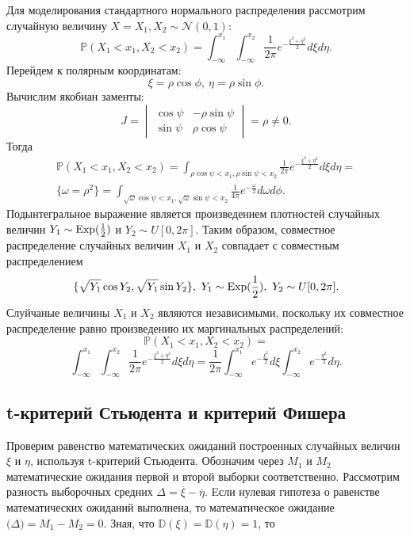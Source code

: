 \documentclass[11pt]{article}
\newcommand{\expon}{\normalfont{\text{Exp}}}
\numberwithin{equation}{section}
\begin{document}
Для моделирования стандартного нормального распределения рассмотрим случайную величину $X = {X_1, X_2} \sim \mathcal{N} (0, 1)$:
$$\mathbb{P}(X_1<x_1, X_2 < x_2) = \int_{-\infty}^{x_1}\int_{-\infty}^{x_2} \frac{1}{2\pi} e^{-\frac{\xi^2+\eta^2}{2}} d\xi d\eta.$$
Перейдем к полярным координатам:
$$\xi = \rho \cos \phi, \ \eta = \rho \sin \phi.$$
Вычислим якобиан заменты:
\begin{equation}
  J = 
  \begin{vmatrix}
    \cos \psi & -\rho \sin \psi\\
    \sin \psi & \rho \cos \psi 
  \end{vmatrix}
  = \rho \not = 0.
\end{equation}
Тогда 
\begin{eqnarray}
  \mathbb{P}(X_1<x_1, X_2 < x_2) = \int_{\rho \cos \psi < x_1, \rho \sin \psi < x_2} \frac{1}{2\pi} e^{-\frac{\xi^2+\eta^2}{2}} d\xi d\eta = \\
  \{\omega= \rho^2\} = \int_{\sqrt{\omega} \cos \psi < x_1, \sqrt{\omega} \sin \psi < x_2} \frac{1}{4\pi} e^{-\frac{\omega}{2}} d\omega d\phi.
\end{eqnarray}
Подынтегральное выражение является произведением плотностей случайных величин
$Y_1 \sim \expon(\frac{1}{2})$ и $Y_2 \sim U[0,2\pi].$ Таким образом, совместное распределение случайных величин $X_1$ и $X_2$ совпадает с совместным распределением 
$$ \{ \sqrt{Y_1}\cos Y_2, \sqrt{Y_1}\sin Y_2\}, \ Y_1 \sim \expon (\frac{1}{2}), \ Y_2 \sim U[0,2\pi].$$ 
Слуйчаные величины $X_1$ и $X_2$ являются независимыми, поскольку их совместное распределение равно произведению их маргинальных распределений:
$$\mathbb{P}(X_1<x_1, X_2 < x_2) = $$
$$\int_{-\infty}^{x_1}\int_{-\infty}^{x_2} \frac{1}{2\pi} e^{-\frac{\xi^2+\eta^2}{2}} d\xi d\eta =  \frac{1}{2\pi} \int_{-\infty}^{x_1} e^{-\frac{\xi^2}{2}} d\xi \int_{-\infty}^{x_2} e^{-\frac{\eta^2}{2}} d\eta.$$
\subsection{t-критерий Стьюдента и критерий Фишера}
Проверим равенство математических ожиданий построенных случайных величин $\xi$ и $\eta$, используя t-критерий Стьюдента. 
Обозначим через $M_1$ и $M_2$ математические ожидания первой и второй выборки соответственно. 
Рассмотрим разность выборочных средних $\Delta = \overline{\xi} − \overline{\eta}$.
Eсли нулевая гипотеза о равенстве математических ожиданий выполнена, то математическое ожидание $\mathbb(\Delta) = M_1 − M_2 = 0$. Зная, что $\mathbb{D}(\xi) = \mathbb{D}(\eta) = 1$, то
\end{document}

